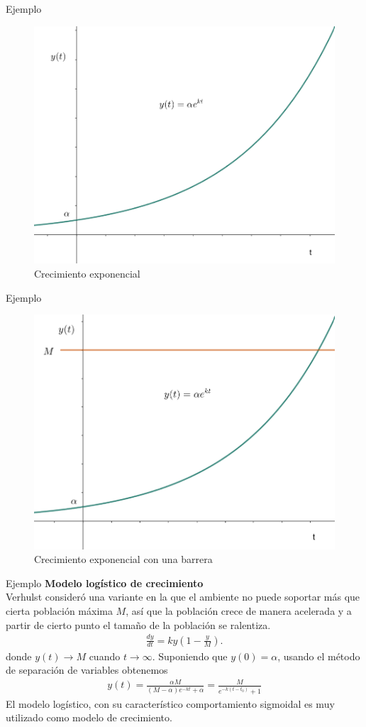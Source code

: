 \documentclass[aspectratio = 169, spanish]{beamer}
\begin{document}
\begin{frame}{Ejemplo}
\begin{figure}
    \centering
    \includegraphics[width=0.5\linewidth]{eje1.png}
    \caption{Crecimiento exponencial}
    \label{fig:ejemplo1}
\end{figure}
\end{frame}


\begin{frame}{Ejemplo}
\begin{figure}
    \centering
    \includegraphics[width=0.5\linewidth]{eje2.png}
    \caption{Crecimiento exponencial con una barrera}
    \label{fig:ejemplo2}
\end{figure}
\end{frame}

\begin{frame}{Ejemplo}
\textbf{Modelo logístico de crecimiento}\\
\vspace{0.5cm}
Verhulst consideró una variante en la que el ambiente no puede soportar más que cierta población máxima $M$, así que la población crece de manera acelerada y  a partir de cierto punto el tamaño de la población se ralentiza. 
\begin{align*}
    \frac{d y}{d t} = k y \left(1 - \frac{y}{M}\right).
\end{align*}
donde $y(t) \to M$ cuando $t \to \infty$. Suponiendo que $y(0) = \alpha$, usando el método de separación de variables obtenemos
\begin{align*}
    y(t) = \frac{\alpha M}{(M - \alpha) e^{-kt} + \alpha} = \frac{ M}{e^{-k(t - t_0)} + 1}
\end{align*}
El modelo logístico, con su característico comportamiento sigmoidal es muy utilizado como modelo de crecimiento. 
\end{frame}
\end{document}
